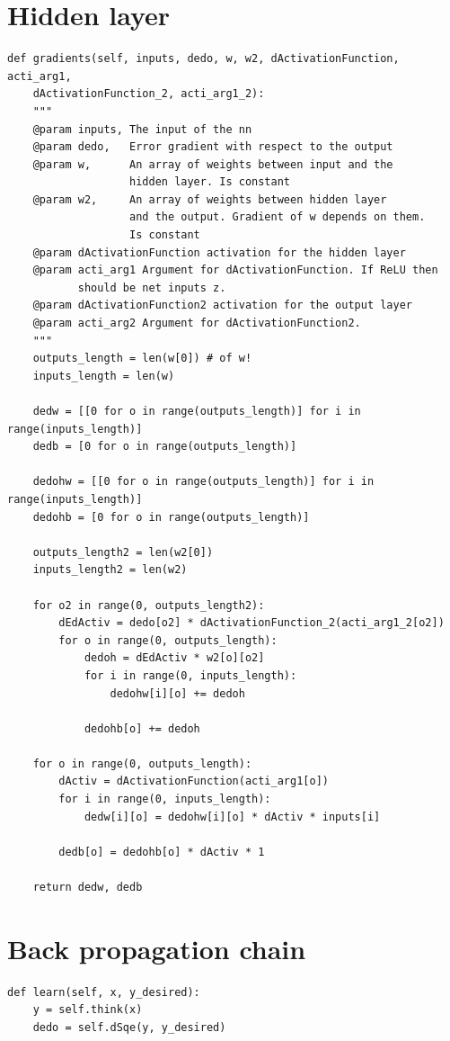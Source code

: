 \begin{appendices}
\section{Hidden layer}
\begin{verbatim}
def gradients(self, inputs, dedo, w, w2, dActivationFunction, acti_arg1, 
    dActivationFunction_2, acti_arg1_2):
    """
    @param inputs, The input of the nn
    @param dedo,   Error gradient with respect to the output
    @param w,      An array of weights between input and the 
                   hidden layer. Is constant
    @param w2,     An array of weights between hidden layer
                   and the output. Gradient of w depends on them.
                   Is constant
    @param dActivationFunction activation for the hidden layer
    @param acti_arg1 Argument for dActivationFunction. If ReLU then
           should be net inputs z.
    @param dActivationFunction2 activation for the output layer
    @param acti_arg2 Argument for dActivationFunction2. 
    """
    outputs_length = len(w[0]) # of w!
    inputs_length = len(w)

    dedw = [[0 for o in range(outputs_length)] for i in range(inputs_length)]
    dedb = [0 for o in range(outputs_length)]
    
    dedohw = [[0 for o in range(outputs_length)] for i in range(inputs_length)]
    dedohb = [0 for o in range(outputs_length)]
    
    outputs_length2 = len(w2[0])
    inputs_length2 = len(w2)

    for o2 in range(0, outputs_length2):
        dEdActiv = dedo[o2] * dActivationFunction_2(acti_arg1_2[o2])
        for o in range(0, outputs_length):
            dedoh = dEdActiv * w2[o][o2]
            for i in range(0, inputs_length):
                dedohw[i][o] += dedoh
            
            dedohb[o] += dedoh

    for o in range(0, outputs_length):
        dActiv = dActivationFunction(acti_arg1[o])
        for i in range(0, inputs_length):
            dedw[i][o] = dedohw[i][o] * dActiv * inputs[i]
        
        dedb[o] = dedohb[o] * dActiv * 1

    return dedw, dedb
\end{verbatim}
\section{Back propagation chain}
\begin{verbatim}
def learn(self, x, y_desired):
    y = self.think(x)
    dedo = self.dSqe(y, y_desired)


\end{verbatim}
\end{appendices}
